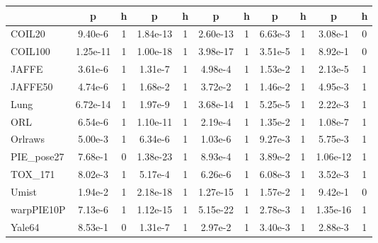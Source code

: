 \documentclass[a4paper,fleqn]{cas-sc}
\begin{document}
\begin{table}[h!]
{\begin{tabular}{lcccccccccc}
		& \textbf{p} & \textbf{h} & \textbf{p} & \textbf{h} & \textbf{p} & \textbf{h} & \textbf{p} & \textbf{h} & \textbf{p} & \textbf{h} \\
		\midrule
		COIL20 & 9.40e-6 & 1 & 1.84e-13 & 1 & 2.60e-13 & 1 & 6.63e-3 & 1 & 3.08e-1 & 0 \\
		COIL100 & 1.25e-11 & 1 & 1.00e-18 & 1 & 3.98e-17 & 1 & 3.51e-5 & 1 & 8.92e-1 & 0 \\
		JAFFE & 3.61e-6 & 1 & 1.31e-7 & 1 & 4.98e-4 & 1 & 1.53e-2 & 1 & 2.13e-5 & 1 \\
		JAFFE50 & 4.74e-6 & 1 & 1.68e-2 & 1 & 3.72e-2 & 1 & 1.46e-2 & 1 & 4.95e-3 & 1 \\
		Lung & 6.72e-14 & 1 & 1.97e-9 & 1 & 3.68e-14 & 1 & 5.25e-5 & 1 & 2.22e-3 & 1 \\
		ORL & 6.54e-6 & 1 & 1.10e-11 & 1 & 2.19e-4 & 1 & 1.35e-2 & 1 & 1.08e-7 & 1 \\
		Orlraws & 5.00e-3 & 1 & 6.34e-6 & 1 & 1.03e-6 & 1 & 9.27e-3 & 1 & 5.75e-3 & 1 \\
		PIE\_pose27 & 7.68e-1 & 0 & 1.38e-23 & 1 & 8.93e-4 & 1 & 3.89e-2 & 1 & 1.06e-12 & 1 \\
		TOX\_171 & 8.02e-3 & 1 & 5.17e-4 & 1 & 6.26e-6 & 1 & 6.08e-3 & 1 & 3.52e-3 & 1 \\
		Umist & 1.94e-2 & 1 & 2.18e-18 & 1 & 1.27e-15 & 1 & 1.57e-2 & 1 & 9.42e-1 & 0 \\
		warpPIE10P & 7.13e-6 & 1 & 1.12e-15 & 1 & 5.15e-22 & 1 & 2.78e-3 & 1 & 1.35e-16 & 1 \\
		Yale64 & 8.53e-1 & 0 & 1.31e-7 & 1 & 2.97e-2 & 1 & 3.40e-3 & 1 & 2.88e-3 & 1 \\
		\bottomrule
	\end{tabular}
}
	\label{tab:t_test_cdrnmf}
\end{table}
\end{document}
